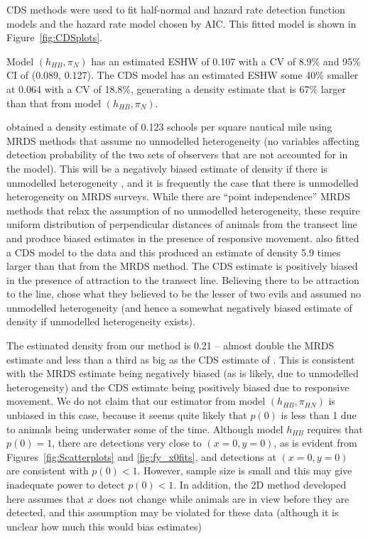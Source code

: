 \documentclass[useAMS,usenatbib,referee]{biom}
\begin{document}
CDS methods were used to fit half-normal and hazard rate detection function models and the hazard rate model chosen by AIC. This fitted model is shown in Figure~\ref{fig:CDSplots}.

Model $(h_{HB},\pi_{N})$ has an estimated ESHW of 0.107 with a CV of 8.9\% and 95\% CI of (0.089, 0.127). The CDS model has an estimated ESHW some 40\% smaller at 0.064 with a CV of 18.8\%, generating a density estimate that is 67\% larger than that from model $(h_{HB},\pi_{N})$.

\cite{Canadas+al:04} obtained a density estimate of 0.123 schools per square nautical mile using MRDS methods that assume no unmodelled heterogeneity (no variables affecting detection probability of the two sets of observers that are not accounted for in the model). This will be a negatively biased estimate of density if there is unmodelled heterogeneity \citep[see][for a summary of this and related issues]{Burt+al:15}, and it is frequently the case that there is unmodelled heterogeneity on MRDS surveys. While there are ``point independence'' MRDS methods that relax the assumption of no unmodelled heterogeneity, these require uniform distribution of perpendicular distances of animals from the transect line and produce biased estimates in the presence of responsive movement. \cite{Canadas+al:04} also fitted a CDS model to the data and this produced an estimate of density 5.9 times larger than that from the MRDS method. The CDS estimate is positively biased in the presence of attraction to the transect line. Believing there to be attraction to the line, \cite{Canadas+al:04} chose what they believed to be the lesser of two evils and assumed no unmodelled heterogeneity (and hence a somewhat negatively biased estimate of density if unmodelled heterogeneity exists).

The estimated density from our method is 0.21 -- almost double the MRDS estimate and less than a third as big as the CDS estimate of \cite{Canadas+al:04}. This is consistent with the MRDS estimate being negatively biased (as is likely, due to unmodelled heterogeneity) and the CDS estimate being positively biased due to responsive movement. We do not claim that our estimator from model $(h_{HB},\pi_{HN})$ is unbiased in this case, because it seems quite likely that $p(0)$ is less than 1 \citep[][estimated it to be 0.79]{Canadas+al:04} due to animals being underwater some of the time. Although model $h_{HB}$ requires that $p(0)=1$, there are detections very close to $(x=0,y=0)$, as is evident from Figures~\ref{fig:Scatterplots} and \ref{fig:fy_x0fits}, and detections at $(x=0,y=0)$ are consistent with $p(0)<1$. However, sample size is small and this may give inadequate power to detect $p(0)<1$. In addition, the 2D method developed here assumes that $x$ does not change while animals are in view before they are detected, and this assumption may be violated for these data (although it is unclear how much this would bias estimates)
\end{document}
